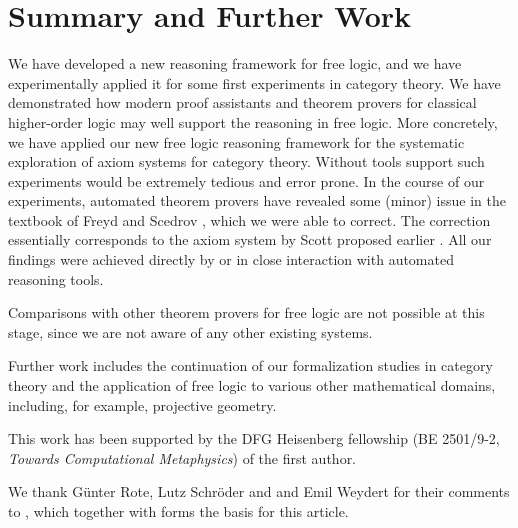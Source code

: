 \section{Summary and Further Work}
We have developed a new reasoning framework for free logic, and we
have experimentally applied it for some first experiments in category
theory.  We have demonstrated how modern proof assistants and theorem
provers for classical higher-order logic may well support the
reasoning in free logic. More concretely, we have applied our new free
logic reasoning framework for the systematic exploration of axiom
systems for category theory. Without tools support such experiments
would be extremely tedious and error prone.
In the course of our experiments, automated theorem provers 
have revealed some (minor) issue in the textbook of Freyd and Scedrov \cite{FreydScedrov90},
which we were able to correct. The correction essentially corresponds
to the axiom system by Scott proposed earlier \cite{Scott67}.
All our findings were achieved directly by or in
close interaction with automated reasoning tools. 



Comparisons with other theorem provers for free logic are not possible at this stage, since we are not aware of any other existing systems.

Further work includes the continuation of our formalization studies in
category theory and the application of free logic to various other
mathematical domains, including, for example,  projective geometry.

\begin{acknowledgements}
This work has been supported by the DFG Heisenberg fellowship (BE
2501/9-2, \emph{Towards Computational Metaphysics}) of the first
author.

We thank G{\"u}nter Rote, Lutz Schr\"oder and and Emil Weydert for their
comments to \cite{ArXiv}, which together with \cite{ICMS} forms the
basis for this article.

\end{acknowledgements}


